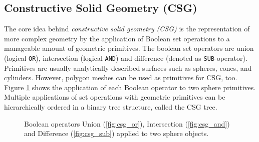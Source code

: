 \subsection{Constructive Solid Geometry (CSG)}
The core idea behind \emph{constructive solid geometry (CSG)} is the representation of more complex geometry by the application of Boolean set operations to a manageable amount of geometric primitives. The boolean set operators are union (logical \texttt{OR}), intersection (logical \texttt{AND}) and difference (denoted as \texttt{SUB}-operator).
Primitives are usually analytically described surfaces such as spheres, cones, and cylinders. However, polygon meshes can be used as primitives for CSG, too. Figure \ref{fig:csg} shows the application of each Boolean operator to two sphere primitives. Multiple applications of set operations with geometric primitives can be hierarchically ordered in a binary tree structure, called the CSG tree.   

\begin{figure} 
	\centering
	\hfill
	\hfill
	\caption{Boolean operators Union (\ref{fig:csg_or}), Intersection (\ref{fig:csg_and}) and Difference (\ref{fig:csg_sub}) applied to two sphere objects.}
	\label{fig:csg}
\end{figure}

